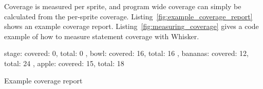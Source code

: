 Coverage is measured per sprite, and program wide coverage can simply be calculated from the per-sprite coverage.
Listing~\ref{fig:example_coverage_report} shows an example coverage report.
Listing~\ref{fig:measuring_coverage} gives a code example of how to measure statement coverage with Whisker.%
\parspace

\begin{listing}[htpb]
    \centering

    \begin{minipage}{.5\textwidth}
        \begin{javascriptcode}
            {
                stage: { covered: 0, total: 0 },
                bowl: { covered: 16, total: 16 },
                bananas: { covered: 12, total: 24 },
                apple: { covered: 15, total: 18 }
            }
        \end{javascriptcode}
    \end{minipage}

    \caption{Example coverage report}
    \label{fig:example_coverage_report}
\end{listing}



